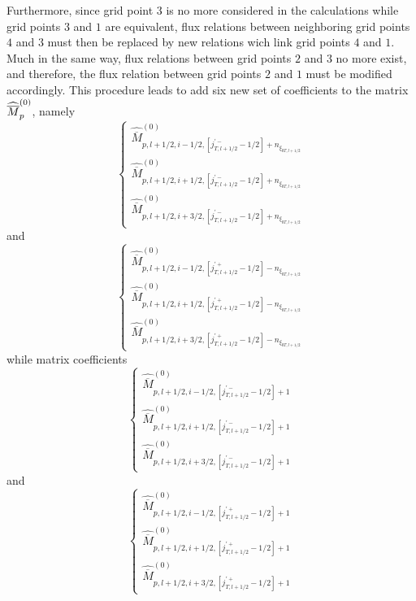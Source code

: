 Furthermore, since grid point $3$ is no more considered in the calculations
while grid points $3$ and $1$ are equivalent, flux relations between
neighboring grid points $4$ and $3$ must then be replaced by new relations
wich link grid points $4$ and $1.$ Much in the same way, flux relations
between grid points $2$ and $3$ no more exist, and therefore, the flux
relation between grid points $2$ and $1$ must be modified accordingly. This
procedure leads to add six new set of coefficients to the matrix $\widehat{%
\overline{M}}_{p}^{\left( 0\right) }$, namely
\begin{equation}
\left\{
\begin{array}{l}
\widehat{\overline{M}}_{p,l+1/2,i-1/2,\left[ j_{T,l+1/2}^{\prime
-}-1/2\right] +n_{\xi _{0T,l+1/2}}}^{\left( 0\right) } \\
\widehat{\overline{M}}_{p,l+1/2,i+1/2,\left[ j_{T,l+1/2}^{\prime
-}-1/2\right] +n_{\xi _{0T,l+1/2}}}^{\left( 0\right) } \\
\widehat{\overline{M}}_{p,l+1/2,i+3/2,\left[ j_{T,l+1/2}^{\prime
-}-1/2\right] +n_{\xi _{0T,l+1/2}}}^{\left( 0\right) }
\end{array}
\right.
\end{equation}
and
\begin{equation}
\left\{
\begin{array}{l}
\widehat{\overline{M}}_{p,l+1/2,i-1/2,\left[ j_{T,l+1/2}^{\prime
+}-1/2\right] -n_{\xi _{0T,l+1/2}}}^{\left( 0\right) } \\
\widehat{\overline{M}}_{p,l+1/2,i+1/2,\left[ j_{T,l+1/2}^{\prime
+}-1/2\right] -n_{\xi _{0T,l+1/2}}}^{\left( 0\right) } \\
\widehat{\overline{M}}_{p,l+1/2,i+3/2,\left[ j_{T,l+1/2}^{\prime
+}-1/2\right] -n_{\xi _{0T,l+1/2}}}^{\left( 0\right) }
\end{array}
\right.
\end{equation}
while matrix coefficients
\begin{equation}
\left\{
\begin{array}{l}
\widehat{\overline{M}}_{p,l+1/2,i-1/2,\left[ j_{T,l+1/2}^{\prime
-}-1/2\right] +1}^{\left( 0\right) } \\
\widehat{\overline{M}}_{p,l+1/2,i+1/2,\left[ j_{T,l+1/2}^{\prime
-}-1/2\right] +1}^{\left( 0\right) } \\
\widehat{\overline{M}}_{p,l+1/2,i+3/2,\left[ j_{T,l+1/2}^{\prime
-}-1/2\right] +1}^{\left( 0\right) }
\end{array}
\right.
\end{equation}
and
\begin{equation}
\left\{
\begin{array}{l}
\widehat{\overline{M}}_{p,l+1/2,i-1/2,\left[ j_{T,l+1/2}^{\prime
+}-1/2\right] +1}^{\left( 0\right) } \\
\widehat{\overline{M}}_{p,l+1/2,i+1/2,\left[ j_{T,l+1/2}^{\prime
+}-1/2\right] +1}^{\left( 0\right) } \\
\widehat{\overline{M}}_{p,l+1/2,i+3/2,\left[ j_{T,l+1/2}^{\prime
+}-1/2\right] +1}^{\left( 0\right) }
\end{array}
\right.
\end{equation}
